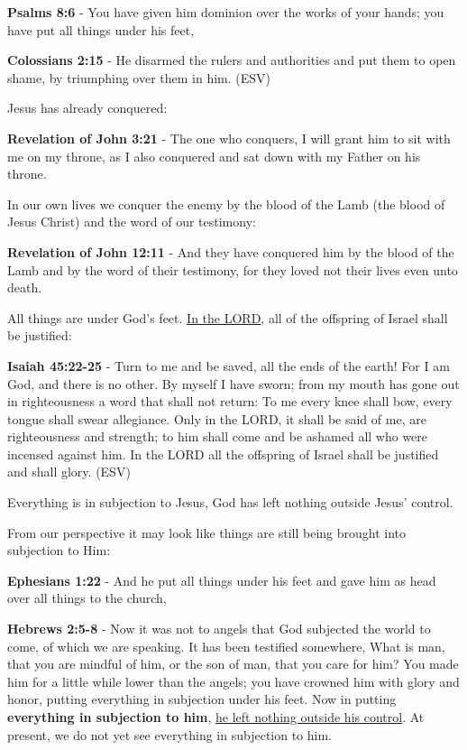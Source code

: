 \documentclass[11pt]{article}
\begin{document}
\textbf{Psalms 8:6} - You have given him dominion over the works of your hands; you have put all things under his feet,

\textbf{Colossians 2:15} - He disarmed the rulers and authorities and put them to open shame, by triumphing over them in him.  (ESV)

Jesus has already conquered:

\textbf{Revelation of John 3:21} - The one who conquers, I will grant him to sit with me on my throne, as I also conquered and sat down with my Father on his throne.

In our own lives we conquer the enemy by the blood of the Lamb (the blood of Jesus Christ) and the word of our testimony:

\textbf{Revelation of John 12:11} - And they have conquered him by the blood of the Lamb and by the word of their testimony, for they loved not their lives even unto death.

All things are under God's feet. \uline{In the LORD}, all of the offspring of Israel shall be justified:

\textbf{Isaiah 45:22-25} - Turn to me and be saved, all the ends of the earth! For I am God, and there is no other. By myself I have sworn; from my mouth has gone out in righteousness a word that shall not return: To me every knee shall bow, every tongue shall swear allegiance. Only in the LORD, it shall be said of me, are righteousness and strength; to him shall come and be ashamed all who were incensed against him. In the LORD all the offspring of Israel shall be justified and shall glory. (ESV)

Everything is in subjection to Jesus, God has left nothing outside Jesus' control.

From our perspective it may look like things are still being brought into subjection to Him:

\textbf{Ephesians 1:22} - And he put all things under his feet and gave him as head over all things to the church,

\textbf{Hebrews 2:5-8} - Now it was not to angels that God subjected the world to come, of which we are speaking. It has been testified somewhere, What is man, that you are mindful of him, or the son of man, that you care for him? You made him for a little while lower than the angels; you have crowned him with glory and honor, putting everything in subjection under his feet. Now in putting \textbf{everything in subjection to him}, \uline{he left nothing outside his control}. At present, we do not yet see everything in subjection to him.
\end{document}
